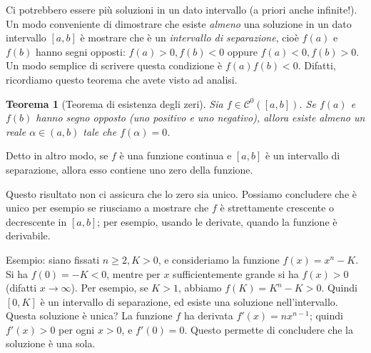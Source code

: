 \documentclass[a4paper]{report}
\newtheorem{theorem}{Teorema}[chapter]
\theoremstyle{definition}
\theoremstyle{remark}
\begin{document}
Ci potrebbero essere più soluzioni in un dato intervallo (a priori anche infinite!). Un modo conveniente di dimostrare che esiste \emph{almeno} una soluzione in un dato intervallo $[a,b]$ è mostrare che è un \emph{intervallo di separazione}, cioè $f(a)$ e $f(b)$ hanno segni opposti: $f(a)>0,f(b)<0$ oppure $f(a)<0,f(b)>0$. Un modo semplice di scrivere questa condizione è $f(a)f(b) < 0$. Difatti, ricordiamo questo teorema che avete visto ad analisi.
\begin{theorem}[Teorema di esistenza degli zeri]
Sia $f \in \mathcal{C}^0([a,b])$. Se $f(a)$ e $f(b)$ hanno segno opposto (uno positivo e uno negativo), allora esiste almeno un reale $\alpha \in (a,b)$ tale che $f(\alpha) = 0$.
\end{theorem}
Detto in altro modo, se $f$ è una funzione continua e $[a,b]$ è un intervallo di separazione, allora esso contiene uno zero della funzione.

Questo risultato non ci assicura che lo zero sia unico. Possiamo concludere che è unico per esempio se riusciamo a mostrare che $f$ è strettamente crescente o decrescente in $[a,b]$; per esempio, usando le derivate, quando la funzione è derivabile.

Esempio: siano fissati $n \geq 2, K > 0$, e consideriamo la funzione $f(x) = x^n - K$. Si ha $f(0) = -K < 0$, mentre per $x$ sufficientemente grande si ha $f(x) > 0$ (difatti $x \to \infty$). Per esempio, se $K>1$, abbiamo $f(K) = K^n - K > 0$. Quindi $[0,K]$ è un intervallo di separazione, ed esiste una soluzione nell'intervallo. Questa soluzione è unica? La funzione $f$ ha derivata $f'(x) = nx^{n-1}$; quindi $f'(x) > 0$ per ogni $x > 0$, e $f'(0) = 0$. Questo permette di concludere che la soluzione è una sola. 

\end{document}
